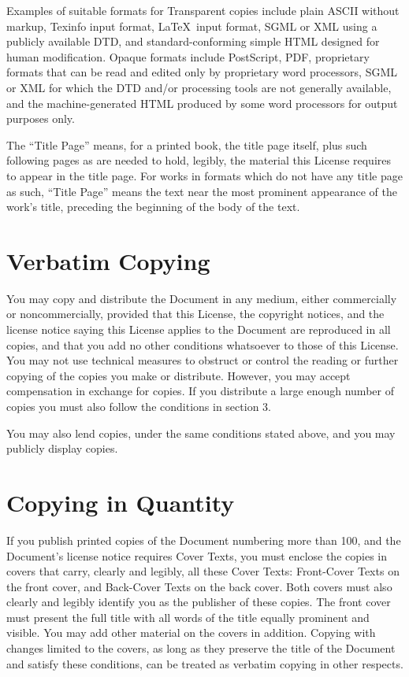 \documentclass{report}
\begin{document}
Examples of suitable formats for Transparent copies include plain
ASCII without markup, Texinfo input format, \LaTeX~input format, SGML
or XML using a publicly available DTD, and standard-conforming simple
HTML designed for human modification.  Opaque formats include
PostScript, PDF, proprietary formats that can be read and edited only
by proprietary word processors, SGML or XML for which the DTD and/or
processing tools are not generally available, and the
machine-generated HTML produced by some word processors for output
purposes only.

The ``Title Page'' means, for a printed book, the title page itself,
plus such following pages as are needed to hold, legibly, the material
this License requires to appear in the title page.  For works in
formats which do not have any title page as such, ``Title Page'' means
the text near the most prominent appearance of the work's title,
preceding the beginning of the body of the text.


\section{Verbatim Copying}

You may copy and distribute the Document in any medium, either
commercially or noncommercially, provided that this License, the
copyright notices, and the license notice saying this License applies
to the Document are reproduced in all copies, and that you add no other
conditions whatsoever to those of this License.  You may not use
technical measures to obstruct or control the reading or further
copying of the copies you make or distribute.  However, you may accept
compensation in exchange for copies.  If you distribute a large enough
number of copies you must also follow the conditions in section 3.

You may also lend copies, under the same conditions stated above, and
you may publicly display copies.


\section{Copying in Quantity}

If you publish printed copies of the Document numbering more than 100,
and the Document's license notice requires Cover Texts, you must enclose
the copies in covers that carry, clearly and legibly, all these Cover
Texts: Front-Cover Texts on the front cover, and Back-Cover Texts on
the back cover.  Both covers must also clearly and legibly identify
you as the publisher of these copies.  The front cover must present
the full title with all words of the title equally prominent and
visible.  You may add other material on the covers in addition.
Copying with changes limited to the covers, as long as they preserve
the title of the Document and satisfy these conditions, can be treated
as verbatim copying in other respects.
\end{document}
